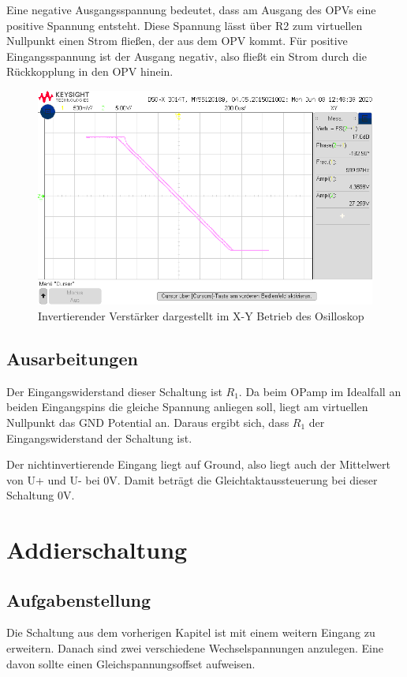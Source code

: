 Eine negative Ausgangsspannung bedeutet, dass am Ausgang des OPVs eine positive Spannung entsteht. Diese
Spannung lässt über R2 zum virtuellen Nullpunkt einen Strom fließen, der aus dem OPV kommt. Für positive
Eingangsspannung ist der Ausgang negativ, also fließt ein Strom durch die Rückkopplung in den OPV hinein.
\begin{figure}[H]
    \centering
    \includegraphics[width=\costumPicWidth]{Lab_1/Messungen/inv_verst/scope_48.png}
    \caption{Invertierender Verstärker dargestellt im X-Y Betrieb des Osilloskop}
    \label{fig:inv_verst_xy}
\end{figure}

\subsection{Ausarbeitungen}
Der Eingangswiderstand dieser Schaltung ist $R_1$. Da beim OPamp im Idealfall an beiden Eingangspins die gleiche Spannung anliegen soll, liegt am virtuellen Nullpunkt das GND Potential an. Daraus ergibt sich, dass $R_1$ der Eingangswiderstand der Schaltung ist.

Der nichtinvertierende Eingang liegt auf Ground, also liegt auch der Mittelwert von U+ und U- bei 0V. Damit beträgt die Gleichtaktaussteuerung bei dieser Schaltung 0V.
\section{Addierschaltung}
\subsection{Aufgabenstellung}
Die Schaltung aus dem vorherigen Kapitel ist mit einem weitern Eingang zu erweitern. Danach sind zwei verschiedene Wechselspannungen anzulegen. Eine davon sollte einen Gleichspannungsoffset aufweisen. 


